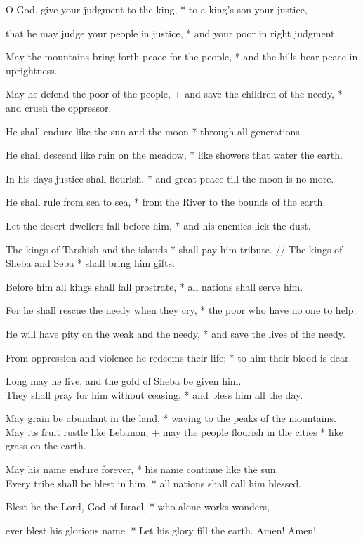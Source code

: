 \item O God, give your judgment to the king, *
to a king's son your justice, 
\item that he may judge your people in justice, *
and your poor in right judgment. 
\item May the mountains bring forth peace for the people, *
and the hills bear peace in uprightness. 
\item May he defend the poor of the people, +
and save the children of the needy, *
and crush the oppressor. 
\item He shall endure like the sun and the moon *
through all generations. 
\item He shall descend like rain on the meadow, *
like showers that water the earth. 
\item In his days justice shall flourish, *
and great peace till the moon is no more. 
\item He shall rule from sea to sea, *
from the River to the bounds of the earth. 
\item Let the desert dwellers fall before him, *
and his enemies lick the dust. 
\item The kings of Tarshish and the islands *
shall pay him tribute. //
The kings of Sheba and Seba *
shall bring him gifts. 
\item Before him all kings shall fall prostrate, *
all nations shall serve him. 
\item For he shall rescue the needy when they cry, *
the poor who have no one to help. 
\item He will have pity on the weak and the needy, *
and save the lives of the needy. 
\item From oppression and violence he redeems their life; *
to him their blood is dear. 
\item Long may he live, and the gold of Sheba be given him. \\
They shall pray for him without ceasing, *
and bless him all the day. 
\item May grain be abundant in the land, *
waving to the peaks of the mountains. \\
May its fruit rustle like Lebanon; +
may the people flourish in the cities *
like grass on the earth. 
\item May his name endure forever, *
his name continue like the sun. \\
Every tribe shall be blest in him, *
all nations shall call him blessed. 
\item Blest be the Lord, God of Israel, *
who alone works wonders, 
\item ever blest his glorious name. *
Let his glory fill the earth. Amen! Amen! 

